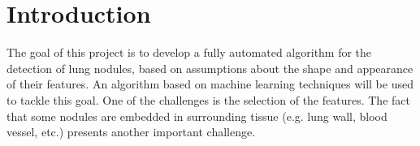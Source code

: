\section{Introduction}
The goal of this project is to develop a fully automated algorithm for the
detection of lung nodules, based on assumptions about the shape and appearance of their
features. An algorithm based on machine learning techniques will be used to
tackle this goal. One of the challenges is the selection of the features. The
fact that some nodules are embedded in surrounding tissue (e.g.
lung wall, blood vessel, etc.) presents another important challenge.



